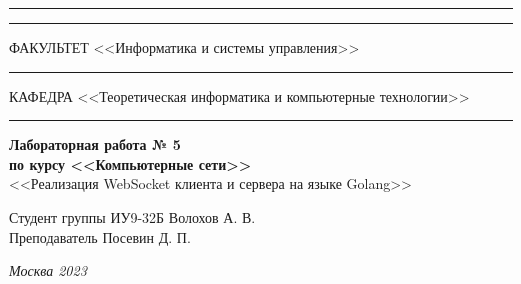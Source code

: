 \documentclass[a4paper, 14pt]{extarticle}
\begin{document}
\begin{titlepage}
\vspace{-25pt}
\hspace{-35pt}\rule{\textwidth}{2.3pt}

\vspace*{-20.3pt}
\hspace{-35pt}\rule{\textwidth}{0.4pt}

\vspace{1.5ex}
\hspace{-35pt} \noindent \small ФАКУЛЬТЕТ\hspace{80pt} <<Информатика и системы управления>>

\vspace*{-16pt}
\hspace{47pt}\rule{0.83\textwidth}{0.4pt}

\vspace{0.5ex}
\hspace{-35pt} \noindent \small КАФЕДРА\hspace{50pt} <<Теоретическая информатика и компьютерные технологии>>

\vspace*{-16pt}
\hspace{30pt}\rule{0.866\textwidth}{0.4pt}
  
\vspace{11em}

\begin{center}
\Large {\bf Лабораторная работа № 5} \\ 
\large {\bf по курсу <<Компьютерные сети>>} \\
\large <<Реализация WebSocket клиента и сервера
на языке Golang>> 
\end{center}\normalsize

\vspace{8em}


\begin{flushright}
  {Студент группы ИУ9-32Б Волохов А. В. \hspace*{15pt}\\ 
  \vspace{2ex}
  Преподаватель Посевин Д. П.\hspace*{15pt}}
\end{flushright}

\bigskip

\vfill
 

\begin{center}
\textsl{Москва 2023}
\end{center}
\end{titlepage}
\end{document}
